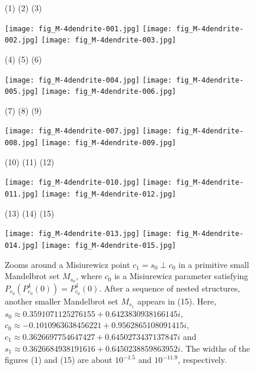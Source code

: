 \begin{figure}[htbp]
\hskip -40mm
{\small (1)}
\hskip 43mm
{\small (2)}
\hskip 43mm
{\small (3)}

\texttt{[image: fig\_M-4dendrite-001.jpg]} \hskip 5mm
\texttt{[image: fig\_M-4dendrite-002.jpg]} \hskip 5mm
\texttt{[image: fig\_M-4dendrite-003.jpg]} \hskip 5mm

\hskip -40mm
{\small (4)}
\hskip 43mm
{\small (5)}
\hskip 43mm
{\small (6)}


\texttt{[image: fig\_M-4dendrite-004.jpg]} \hskip 5mm
\texttt{[image: fig\_M-4dendrite-005.jpg]} \hskip 5mm
\texttt{[image: fig\_M-4dendrite-006.jpg]} \hskip 5mm


\hskip -40mm
{\small (7)}
\hskip 43mm
{\small (8)}
\hskip 43mm
{\small (9)}

\texttt{[image: fig\_M-4dendrite-007.jpg]} \hskip 5mm
\texttt{[image: fig\_M-4dendrite-008.jpg]} \hskip 5mm
\texttt{[image: fig\_M-4dendrite-009.jpg]} \hskip 5mm


\hskip -38mm
{\small (10)}
\hskip 41mm
{\small (11)}
\hskip 41mm
{\small (12)}

\texttt{[image: fig\_M-4dendrite-010.jpg]} \hskip 5mm
\texttt{[image: fig\_M-4dendrite-011.jpg]} \hskip 5mm
\texttt{[image: fig\_M-4dendrite-012.jpg]} \hskip 5mm



\hskip -38mm
{\small (13)}
\hskip 41mm
{\small (14)}
\hskip 41mm
{\small (15)}

\texttt{[image: fig\_M-4dendrite-013.jpg]} \hskip 5mm
\texttt{[image: fig\_M-4dendrite-014.jpg]} \hskip 5mm
\texttt{[image: fig\_M-4dendrite-015.jpg]} \hskip 5mm

\caption{\small Zooms around a Misiurewicz point 
$c_1 = s_0 \perp c_0$ 
in a primitive small Mandelbrot set $M_{s_0}$, where $c_0$ is a 
Misiurewicz parameter satisfying $P_{c_0}(P_{c_0}^4(0)) = P_{c_0}^4(0)$.
After a sequence of nested structures, another smaller Mandelbrot
set $M_{s_1}$ appears in (15). Here, 
$s_0 \approx 0.3591071125276155 + 0.6423830938166145i$, \
$c_0 \approx -0.1010963638456221 + 0.9562865108091415i$, \
$c_1 \approx 0.3626697754647427 + 0.6450273437137847i$ and
$s_1 \approx 0.3626684938191616 + 0.6450238859863952i$. 
The widths of the figures (1) and (15) are about $10^{-1.5}$
and $10^{-11.9}$, respectively.}
\label{figures of a primitive-Misiurewicz case}
\end{figure}









